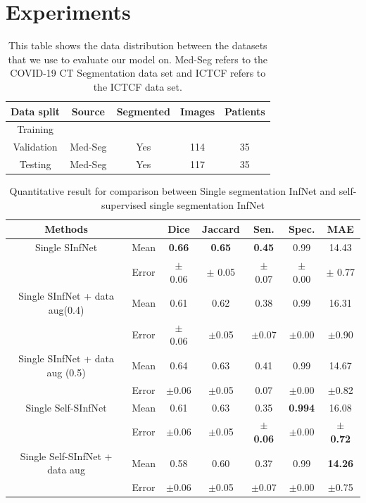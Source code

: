 \section{Experiments}

\begin{table}[!h]
	\centering
	\begin{tabular}{|c||c|c|c|c|} \hline
		Data split & Source & Segmented & Images & Patients \\\hline
		Training & \vtop{\hbox{\strut Med-Seg}\hbox{\strut ICTCF}}&
		\vtop{\hbox{\strut Yes}\hbox{\strut No}} & 
		\vtop{\hbox{\strut 698}\hbox{\strut 6654}}&
		\vtop{\hbox{\strut 39}\hbox{\strut 1338}}\\\hline
		Validation & Med-Seg & Yes & 114 & 35 \\\hline
		Testing & Med-Seg & Yes & 117 & 35 \\\hline
	\end{tabular}
	\caption{This table shows the data distribution between the datasets that we use to evaluate our model on. Med-Seg refers to the COVID-19 CT Segmentation data set and ICTCF refers to the ICTCF data set.}
	\label{tab:dataset}
\end{table}

\begin{table}[!h]
	\centering
	\begin{tabular}{| c | c || c c c c c ||}
		\hline
		Methods & & Dice & Jaccard & Sen. & Spec. & MAE \\ \hline
		Single SInfNet &  Mean & \textbf{0.66} & \textbf{0.65} & \textbf{0.45} & 0.99 & 14.43 \\ \cline{2-7}
		& Error & $\pm$ 0.06 & $\pm$ 0.05 & $\pm$ 0.07 & $\pm$ 0.00 & $\pm$ 0.77 \\ \hline
		Single SInfNet + data aug(0.4) &  Mean & 0.61 & 0.62 & 0.38 & 0.99 & 16.31 \\ \cline{2-7}
		& Error & $\pm$ 0.06 & $\pm$0.05 &$\pm$0.07 &$\pm$0.00 &$\pm$0.90 \\ \hline
		Single SInfNet + data aug (0.5) &  Mean &0.64 &0.63 &0.41 &0.99 & 14.67 \\ \cline{2-7}
		& Error &$\pm$0.06 &$\pm$0.05 &0.07 &$\pm$0.00 & $\pm$0.82 \\ \hline \hline
		Single Self-SInfNet &  Mean & 0.61 & 0.63 & 0.35 & \textbf{0.994} & 16.08 \\ \cline{2-7}
		& Error & $\pm$0.06 & $\pm$0.05 &$\pm$ \textbf{0.06} & $\pm$0.00 & $\pm$ \textbf{0.72} \\ \hline
		Single Self-SInfNet + data aug &  Mean & 0.58 & 0.60 & 0.37 & 0.99 & \textbf{14.26} \\ \cline{2-7}
		& Error & $\pm$0.06 & $\pm$0.05 & $\pm$0.07 & $\pm$0.00 & $\pm$0.75 \\ \hline
	\end{tabular}
	\caption{Quantitative result for comparison between Single segmentation InfNet and self-supervised single segmentation InfNet}
	\label{tab:single}
\end{table}

